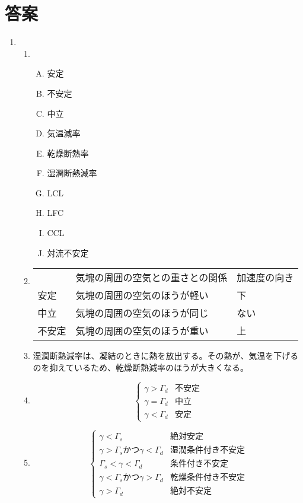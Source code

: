 \documentclass{jsarticle}
\newenvironment{problems}
{
  \renewcommand\labelenumi{\doublebox{\arabic{enumi}}}
  \begin{enumerate}
}{
  \end{enumerate}
  \renewcommand\labelenumi{\arabic{enumi}.}
}
\begin{document}
\section{答案}
\begin{problems}
\item 
	\begin{enumerate}[(1)]
  \item
  	\begin{enumerate}[(A)]
    \item 安定
    \item 不安定
    \item 中立
    \item 気温減率
    \item 乾燥断熱率
    \item 湿潤断熱減率
    \item LCL
    \item LFC
    \item CCL
    \item 対流不安定
    \end{enumerate}

\item
\begin{table}[H]
\begin{tabular}{lll}
    & 気塊の周囲の空気との重さとの関係 & 加速度の向き \\
安定  & 気塊の周囲の空気のほうが軽い   & 下      \\
中立  & 気塊の周囲の空気のほうが同じ   & ない    \\
不安定 & 気塊の周囲の空気のほうが重い   & 上     
\end{tabular}
\end{table}
  \item
湿潤断熱減率は、凝結のときに熱を放出する。その熱が、気温を下げるのを抑えているため、乾燥断熱減率のほうが大きくなる。
  \item
  \begin{equation}
  \begin{cases}
    \gamma > \Gamma_d & 不安定\\
  \gamma = \Gamma_d & 中立\\
  \gamma < \Gamma_d & 安定
  \end{cases}
  \end{equation}
\item
  \begin{equation}
  \begin{cases}
    \gamma < \Gamma_s & 絶対安定\\
    \gamma > \Gamma_s かつ\gamma < \Gamma_d & 湿潤条件付き不安定\\
  \Gamma_s < \gamma < \Gamma_d & 条件付き不安定\\
  \gamma < \Gamma_s かつ \gamma > \Gamma_d & 乾燥条件付き不安定\\
  \gamma > \Gamma_d & 絶対不安定
  \end{cases}
  \end{equation}


\end{enumerate}
\end{problems}
\end{document}

